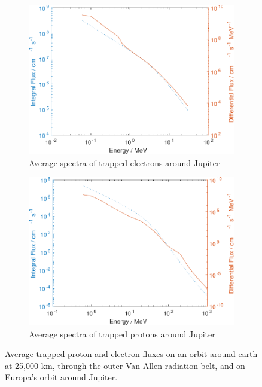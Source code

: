 \begin{figure}[htb]
\begin{subfigure}[b]{0.475\textwidth}
         \centering
         \includegraphics[width=\textwidth]{Media/J_Electron_Flux}
         \caption{Average spectra of trapped electrons around Jupiter}
         \label{fig:trappedelectronsJupiter}
     \end{subfigure}
     \hfill
     \begin{subfigure}[b]{0.475\textwidth}
         \centering
         \includegraphics[width=\textwidth]{Media/J_Proton_Flux}
         \caption{Average spectra of trapped protons around Jupiter}
         \label{fig:trappedprotonsJupiter}
     \end{subfigure}
        \caption{Average trapped proton and electron fluxes on an orbit around earth at 25,000 km, through the outer Van Allen radiation belt, and on Europa's orbit around Jupiter.}
        \label{fig:trappedprotonelectronfluxes}
\end{figure}

